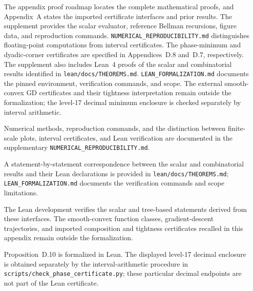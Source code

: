 
The appendix proof roadmap locates the complete mathematical proofs, and
Appendix~A states the imported certificate interfaces and prior results.
The supplement provides the scalar evaluator, reference Bellman recursions,
figure data, and reproduction commands.
\nolinkurl{NUMERICAL_REPRODUCIBILITY.md} distinguishes floating-point
computations from interval certificates. The phase-minimum and dyadic-corner
certificates are specified in Appendices~D.8 and~D.7, respectively.
The supplement also includes Lean~4 proofs of the scalar and combinatorial
results identified in \nolinkurl{lean/docs/THEOREMS.md}.
\nolinkurl{LEAN_FORMALIZATION.md} documents the pinned environment,
verification commands, and scope. The external smooth-convex GD certificates
and their tightness interpretation remain outside the formalization; the
level-17 decimal minimum enclosure is checked separately by interval arithmetic.

Numerical methods, reproduction commands, and the distinction between
finite-scale plots, interval certificates, and Lean verification are documented
in the supplementary \nolinkurl{NUMERICAL_REPRODUCIBILITY.md}.

A statement-by-statement correspondence between the scalar and combinatorial
results and their Lean declarations is provided in
\nolinkurl{lean/docs/THEOREMS.md}; \nolinkurl{LEAN_FORMALIZATION.md}
documents the verification commands and scope limitations.

The Lean development verifies the scalar and tree-based statements derived
from these interfaces. The smooth-convex function classes, gradient-descent
trajectories, and imported composition and tightness certificates recalled
in this appendix remain outside the formalization.

Proposition~D.10 is formalized in Lean. The displayed level-17 decimal
enclosure is obtained separately by the interval-arithmetic procedure in
\nolinkurl{scripts/check_phase_certificate.py}; these particular decimal
endpoints are not part of the Lean certificate.
